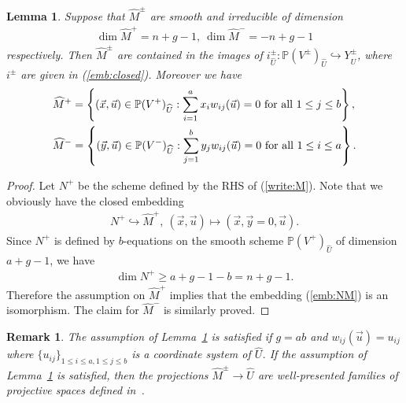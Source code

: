 \documentclass[11pt]{amsart}
\theoremstyle{plain}
\newtheorem{lem}[thm]{Lemma}
\newtheorem{rmk}[thm]{Remark}
\begin{document}
\begin{lem}\label{lem:Msmooth}
Suppose that 
$\widehat{M}^{\pm}$ are smooth and irreducible of dimension 
\begin{align}\label{dim:M}
\dim \widehat{M}^{+}=n+g-1, \ \dim \widehat{M}^{-}=-n+g-1
\end{align}
respectively. 
Then 
$\widehat{M}^{\pm}$ are contained in the 
images of 
$i_{\widehat{U}}^{\pm} \colon \mathbb{P}(V^{\pm})_{\widehat{U}} \hookrightarrow
Y_{\widehat{U}}^{\pm}$, 
where $i^{\pm}$ are given in (\ref{emb:closed}). 
Moreover  
we have
\begin{align}\label{write:M}
&\widehat{M}^{+}=\left\{(\vec{x}, \vec{u}) 
\in \mathbb{P}(V^{+})_{\widehat{U}} : 
\sum_{i=1}^a x_i w_{ij}(\vec{u})=0 \mbox{ for all }
1\le j\le b\right\}, \\
\notag
&\widehat{M}^{-}
=\left\{(\vec{y}, \vec{u}) \in \mathbb{P}(V^{-})_{\widehat{U}} : 
\sum_{j=1}^b y_j w_{ij}(\vec{u})=0 \mbox{ for all }
1\le i\le a\right\}.
\end{align}
\end{lem}
\begin{proof}
Let $N^{+}$ be the scheme defined by the RHS of (\ref{write:M}). 
Note that we obviously have the closed embedding
\begin{align}\label{emb:NM}
N^{+} \hookrightarrow \widehat{M}^{+}, \ 
(\vec{x}, \vec{u}) \mapsto (\vec{x}, \vec{y}=0, \vec{u}).
\end{align}
Since $N^+$ is defined by $b$-equations on 
the smooth scheme $\mathbb{P}(V^+)_{\widehat{U}}$
of dimension $a+g-1$, 
we have 
\begin{align*}
\dim N^+ \ge a+g-1-b=n+g-1.
\end{align*}
Therefore the assumption on $\widehat{M}^{+}$ implies that 
the embedding (\ref{emb:NM}) is an isomorphism. 
The claim for $\widehat{M}^{-}$ is similarly proved. 
\end{proof}

\begin{rmk}\label{rmk:prepared}
The assumption of Lemma~\ref{lem:Msmooth}
is satisfied if 
$g=ab$ and $w_{ij}(\vec{u})=u_{ij}$
where $\{u_{ij}\}_{1\le i\le a, 1\le j\le b}$ 
is a coordinate system of $\widehat{U}$. 
If the assumption of Lemma~\ref{lem:Msmooth}
is satisfied, then the projections
$\widehat{M}^{\pm} \to \widehat{U}$ are 
well-presented families of projective spaces
defined in~\cite[Section~3]{MR0349687}. 
\end{rmk}
\end{document}
